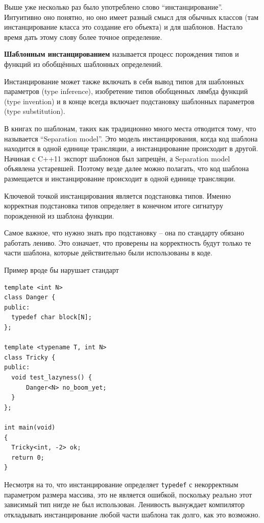\documentclass[a4paper,12pt,oneside]{article}
\begin{document}
Выше уже несколько раз было употреблено слово ``инстанцирование''. Интуитивно оно понятно, но оно имеет разный смысл для обычных классов (там инстанцирование класса это создание его объекта) и для шаблонов. Настало время дать этому слову более точное определение.

\textbf{Шаблонным инстанцированием} называется процесс порождения типов и функций из обобщённых шаблонных определений.

Инстанцирование может также включать в себя вывод типов для шаблонных параметров (type inference), изобретение типов обобщенных лямбда функций (type invention) и в конце всегда включает подстановку шаблонных параметров (type substitution).

В книгах по шаблонам, таких как \cite{vandervoord} традиционно много места отводится тому, что называется ``Separation model''. Это модель инстанцирования, когда код шаблона находится в одной единице трансляции, а инстанцирование происходит в другой. Начиная с C++11 \cite{stdcpp11} экспорт шаблонов был запрещён, а Separation model объявлена устаревшей. Поэтому везде далее можно полагать, что код шаблона размещается и инстанцирование происходит в одной единице трансляции.

Ключевой точкой инстанцирования является подстановка типов. Именно корректная подстановка типов определяет в конечном итоге сигнатуру порожденной из шаблона функции.

Самое важное, что нужно знать про подстановку -- она по стандарту обязано работать лениво. Это означает, что проверены на корректность будут только те части шаблона, которые действительно были использованы в коде.

Пример вроде бы нарушает стандарт

\begin{lstlisting}
template <int N>
class Danger {
public:
  typedef char block[N]; 
};

template <typename T, int N>
class Tricky {
public:
  void test_lazyness() {
      Danger<N> no_boom_yet;
  }
};

int main(void)
{
  Tricky<int, -2> ok;
  return 0;
}
\end{lstlisting}

Несмотря на то, что инстанцирование определяет \lstinline!typedef! с некорректным параметром размера массива, это не является ошибкой, поскольку реально этот зависимый тип нигде не был использован. Ленивость вынуждает компилятор откладывать инстанцирование любой части шаблона так долго, как это возможно.
\end{document}
